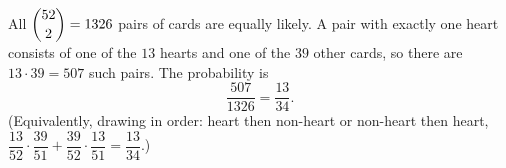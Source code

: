 All $\dbinom{52}{2}=1326$ pairs of cards are equally likely. A pair with exactly one heart consists of one of the $13$ hearts and one of the $39$ other cards, so there are $13\cdot39=507$ such pairs. The probability is
\[\dfrac{507}{1326}=\boxed{\dfrac{13}{34}}.\]
(Equivalently, drawing in order: heart then non-heart or non-heart then heart, $\dfrac{13}{52}\cdot\dfrac{39}{51}+\dfrac{39}{52}\cdot\dfrac{13}{51}=\dfrac{13}{34}$.)
